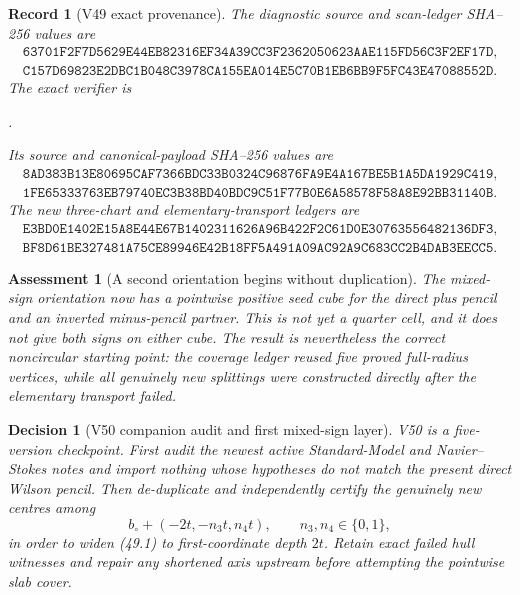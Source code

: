 \documentclass[11pt,oneside]{article}
\newtheorem{assessment}[theorem]{Assessment}
\newtheorem{record}[theorem]{Record}
\newtheorem{decision}[theorem]{Decision}
\theoremstyle{definition}
\theoremstyle{remark}
\begin{document}
\begin{record}[V49 exact provenance]
\label{rec:newv49-provenance}
The diagnostic source and scan-ledger SHA--256 values are
\[
\begin{gathered}
\texttt{63701F2F7D5629E44EB82316EF34A39CC3F2362050623AAE115FD56C3F2EF17D},\\
\texttt{C157D69823E2DBC1B048C3978CA155EA014E5C70B1EB6BB9F5FC43E47088552D}.
\end{gathered}                                         \tag{49.12}
\]
The exact verifier is
\begin{center}
\footnotesize
{}.
\end{center}
Its source and canonical-payload SHA--256 values are
\[
\begin{gathered}
\texttt{8AD383B13E80695CAF7366BDC33B0324C96876FA9E4A167BE5B1A5DA1929C419},\\
\texttt{1FE65333763EB79740EC3B38BD40BDC9C51F77B0E6A58578F58A8E92BB31140B}.
\end{gathered}                                         \tag{49.13}
\]
The new three-chart and elementary-transport ledgers are
\[
\begin{gathered}
\texttt{E3BD0E1402E15A8E44E67B1402311626A96B422F2C61D0E30763556482136DF3},\\
\texttt{BF8D61BE327481A75CE89946E42B18FF5A491A09AC92A9C683CC2B4DAB3EECC5}.
\end{gathered}                                         \tag{49.14}
\]
\end{record}

\begin{assessment}[A second orientation begins without duplication]
\label{ass:newv49}
The mixed-sign orientation now has a pointwise positive seed cube
for the direct plus pencil and an inverted minus-pencil partner.
This is not yet a quarter cell, and it does not give both signs on
either cube.  The result is nevertheless the correct noncircular
starting point: the coverage ledger reused five proved full-radius
vertices, while all genuinely new splittings were constructed
directly after the elementary transport failed.
\end{assessment}

\begin{decision}[V50 companion audit and first mixed-sign layer]
\label{dec:newv49-next}
V50 is a five-version checkpoint.  First audit the newest active
Standard-Model and Navier--Stokes notes and import nothing whose
hypotheses do not match the present direct Wilson pencil.  Then
de-duplicate and independently certify the genuinely new centres
among
\[
 b_\circ+(-2t,-n_3t,n_4t),
 \qquad n_3,n_4\in\{0,1\},                             \tag{49.15}
\]
in order to widen (49.1) to first-coordinate depth \(2t\).
Retain exact failed hull witnesses and repair any shortened axis
upstream before attempting the pointwise slab cover.
\end{decision}
\end{document}
